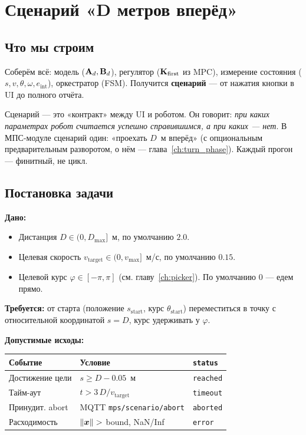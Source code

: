 \chapter{Сценарий «D метров вперёд»}
\label{ch:scenario}

\section{Что мы строим}

Соберём всё: модель ($\mathbf{A}_d, \mathbf{B}_d$), регулятор ($\mathbf{K}_\text{first}$
из MPC), измерение состояния ($s, v, \theta, \omega, e_\text{int}$),
оркестратор (FSM). Получится \textbf{сценарий} --- от нажатия кнопки в UI
до полного отчёта.

\begin{ideabox}
Сценарий --- это «контракт» между UI и роботом. Он говорит:
\emph{при каких параметрах робот считается успешно справившимся,
а при каких --- нет}. В МПС-модуле сценарий один: «проехать $D$~м
вперёд» (с опциональным предварительным разворотом, о нём ---
глава~\ref{ch:turn_phase}). Каждый прогон --- финитный, не цикл.
\end{ideabox}

\section{Постановка задачи}

\textbf{Дано:}
\begin{itemize}
  \item Дистанция $D \in (0, D_\text{max}]$~м, по умолчанию $2.0$.
  \item Целевая скорость $v_\text{target} \in (0, v_\text{max}]$~м/с,
        по умолчанию $0.15$.
  \item Целевой курс $\varphi \in [-\pi, \pi]$ (см. главу~\ref{ch:picker}).
        По умолчанию $0$ --- едем прямо.
\end{itemize}

\textbf{Требуется:} от старта (положение $s_\text{start}$, курс
$\theta_\text{start}$) переместиться в точку с относительной
координатой $s = D$, курс удерживать у $\varphi$.

\textbf{Допустимые исходы:}
\begin{center}
\begin{tabular}{lll}
\toprule
\textbf{Событие} & \textbf{Условие} & \texttt{status}\\
\midrule
Достижение цели & $s \ge D - 0.05$~м & \texttt{reached}\\
Тайм-аут        & $t > 3\,D / v_\text{target}$ & \texttt{timeout}\\
Принудит. abort & MQTT \texttt{mps/scenario/abort} & \texttt{aborted}\\
Расходимость    & $\|\bm{x}\| > $ bound, NaN/Inf & \texttt{error}\\
\bottomrule
\end{tabular}
\end{center}

